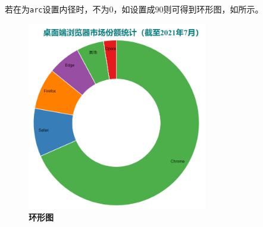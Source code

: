 若在为\verb|arc|设置内径时，不为0，如设置成90则可得到环形图，如所示。

\begin{figure}[htbp]
    \centering
    \includegraphics[width=0.7\textwidth]{figure/D3/donut_browser_share.png}
    \caption{\textbf{环形图}}
    \label{fig:donut_browser_share}
\end{figure}